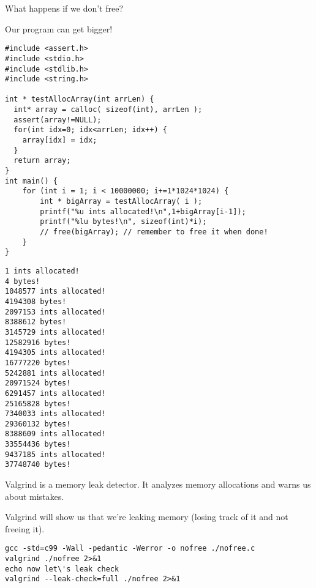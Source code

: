 \documentclass[11pt]{article}
\begin{document}
What happens if we don't free?

Our program can get bigger!



\begin{verbatim}
#include <assert.h>
#include <stdio.h>
#include <stdlib.h>
#include <string.h>

int * testAllocArray(int arrLen) {
  int* array = calloc( sizeof(int), arrLen );
  assert(array!=NULL);
  for(int idx=0; idx<arrLen; idx++) {
    array[idx] = idx;
  }
  return array;
}
int main() {
    for (int i = 1; i < 10000000; i+=1*1024*1024) {
        int * bigArray = testAllocArray( i );
        printf("%u ints allocated!\n",1+bigArray[i-1]);
        printf("%lu bytes!\n", sizeof(int)*i);
        // free(bigArray); // remember to free it when done!
    }
}
\end{verbatim}

\begin{verbatim}
1 ints allocated!
4 bytes!
1048577 ints allocated!
4194308 bytes!
2097153 ints allocated!
8388612 bytes!
3145729 ints allocated!
12582916 bytes!
4194305 ints allocated!
16777220 bytes!
5242881 ints allocated!
20971524 bytes!
6291457 ints allocated!
25165828 bytes!
7340033 ints allocated!
29360132 bytes!
8388609 ints allocated!
33554436 bytes!
9437185 ints allocated!
37748740 bytes!
\end{verbatim}

Valgrind is a memory leak detector. It analyzes memory allocations and
warns us about mistakes.

Valgrind will show us that we're leaking memory (losing track of it
and not freeing it).

\begin{verbatim}
gcc -std=c99 -Wall -pedantic -Werror -o nofree ./nofree.c
valgrind ./nofree 2>&1
echo now let\'s leak check
valgrind --leak-check=full ./nofree 2>&1
\end{verbatim}
\end{document}
